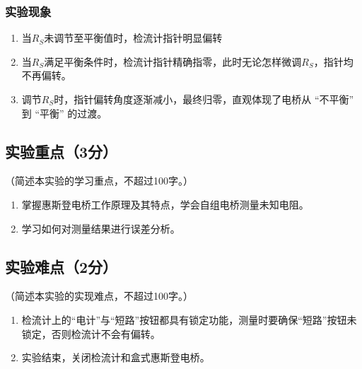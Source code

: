 \documentclass[]{../template/Report}%
\begin{document}
\subsubsection{实验现象}

\begin{enumerate}
    \item 当\(R_S\)未调节至平衡值时，检流计指针明显偏转
    \item 当\(R_S\)满足平衡条件时，检流计指针精确指零，此时无论怎样微调\(R_S\)，指针均不再偏转。
    \item 调节\(R_S\)时，指针偏转角度逐渐减小，最终归零，直观体现了电桥从 “不平衡” 到 “平衡” 的过渡。
\end{enumerate}

\subsection{实验重点（3分）}
（简述本实验的学习重点，不超过100字。）
\begin{enumerate}
    \item 掌握惠斯登电桥工作原理及其特点，学会自组电桥测量未知电阻。
    \item 学习如何对测量结果进行误差分析。
\end{enumerate}
\subsection{实验难点（2分）}
（简述本实验的实现难点，不超过100字。）
\begin{enumerate}
    \item  检流计上的“电计”与“短路”按钮都具有锁定功能，测量时要确保“短路”按钮未锁定，否则检流计不会有偏转。
    \item 实验结束，关闭检流计和盒式惠斯登电桥。
\end{enumerate}
\end{document}
